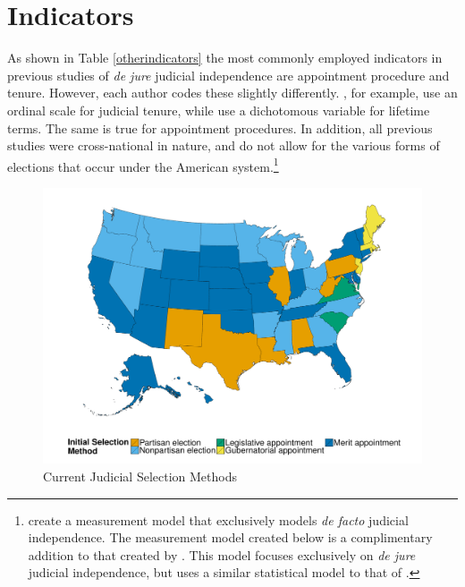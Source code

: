 \documentclass[12pt]{article}
\begin{document}
\doublespacing\normalsize
\section{Indicators}\label{Indicators}
As shown in Table \ref{otherindicators} the most commonly employed indicators in previous studies of \textit{de jure} judicial independence are appointment procedure and tenure.  However, each author codes these slightly differently.  \citet{Feld2003}, for example,  use an ordinal scale for judicial tenure, while \citet{Melton2014} use a dichotomous variable for lifetime terms.  The same is true for appointment procedures.  In addition, all previous studies were cross-national in nature, and do not allow for the various forms of elections that occur under the American system.\footnote{\citet*{Linzer2014} create a measurement model that exclusively models \textit{de facto} judicial independence.  The measurement model created below is a complimentary addition to that created by \citeauthor{Linzer2014}.  This model focuses exclusively on \textit{de jure} judicial independence, but uses a similar statistical model to that of \citeauthor{Linzer2014}.}    


\begin{figure}[tbh]\centering\caption{Current Judicial Selection Methods}\label{selectionmap}
	\includegraphics[scale=.5]{graphics/colr_select.pdf}
\end{figure}
\end{document}
